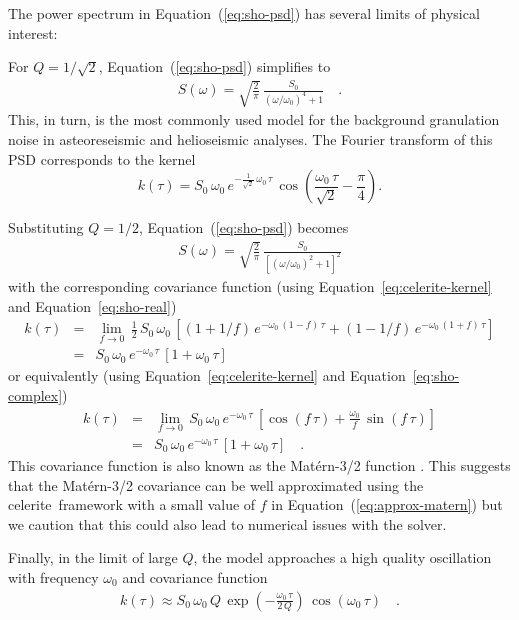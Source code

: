 \documentclass[manuscript, letterpaper]{aastex6}
\newcommand{\project}[1]{\textsf{#1}}
\newcommand{\celerite}{\project{celerite}}
\renewcommand{\eqref}[1]{\ref{eq:#1}}
\newcommand{\Eq}[1]{Equation~(\eqref{#1})}
\newcommand{\eq}[1]{\Eq{#1}}
\newcommand{\eqalt}[1]{Equation~\eqref{#1}}
\newcommand{\eqlabel}[1]{\label{eq:#1}}
\begin{document}
The power spectrum in \eq{sho-psd} has several limits of physical interest:
\begin{itemize}

{\item For $Q = 1/\sqrt{2}$, \eq{sho-psd} simplifies to
\begin{eqnarray}\eqlabel{granulation-psd}
S(\omega) = \sqrt{\frac{2}{\pi}}\,\frac{S_0}{(\omega/\omega_0)^4+1} \quad.
\end{eqnarray}
This, in turn, is the most commonly used model for the background granulation
noise in asteoreseismic \citep{Kallinger:2014} and helioseismic
\citep{Harvey:1985, Michel:2009} analyses.
The Fourier transform of this PSD corresponds to the kernel
\begin{equation}
k(\tau) = S_0\,\omega_0\,e^{-\frac{1}{\sqrt{2}}\,\omega_0\,\tau}\,
    \cos{\left(\frac{\omega_0\,\tau}{\sqrt{2}}-\frac{\pi}{4}\right)}.
\end{equation}}

{\item Substituting $Q = 1/2$, \eq{sho-psd} becomes
\begin{eqnarray}
S(\omega) =
    \sqrt{\frac{2}{\pi}}\,\frac{S_0}{\left[(\omega/\omega_0)^2+1\right]^2}
\end{eqnarray}
with the corresponding covariance function (using
\eqalt{celerite-kernel} and \eqalt{sho-real})
\begin{eqnarray}\eqlabel{approx-matern}
k(\tau) &=& \lim_{f \to 0}\,
    \frac{1}{2}\,S_0\,\omega_0\,
    \left[\left(1+1/f\right)\,e^{-\omega_0\,(1-f)\,\tau} +
          \left(1-1/f\right)\,e^{-\omega_0\,(1+f)\,\tau}
    \right] \\
&=& S_0\,\omega_0\,e^{-\omega_0\,\tau}\,[1+\omega_0\,\tau]
\end{eqnarray}
or equivalently (using \eqalt{celerite-kernel} and \eqalt{sho-complex})
\begin{eqnarray}\eqlabel{approx-matern}
k(\tau) &=& \lim_{f \to 0}\,
    S_0\,\omega_0\,e^{-\omega_0\,\tau}\,
    \left[\cos(f\,\tau) + \frac{\omega_0}{f}\,\sin(f\,\tau)\right] \\
&=& S_0\,\omega_0\,e^{-\omega_0\,\tau}\,[1+\omega_0\,\tau] \quad.
\end{eqnarray}
This covariance function is also known as the Mat\'ern-3/2 function
\citep{Rasmussen:2006}.
This suggests that the Mat\'ern-3/2 covariance can be well approximated using
the \celerite\ framework with a small value of $f$ in \eq{approx-matern} but we
caution that this could also lead to numerical issues with the solver.
}

{\item Finally, in the limit of large $Q$, the model approaches a high
    quality oscillation with frequency $\omega_0$ and covariance function
\begin{eqnarray}
k(\tau) \approx
    S_0\,\omega_0\,Q\,
    \exp\left(-\frac{\omega_0\,\tau}{2\,Q}\right)\,
    \cos\left(\omega_0\,\tau\right) \quad.
\end{eqnarray}}

\end{itemize}
\end{document}
